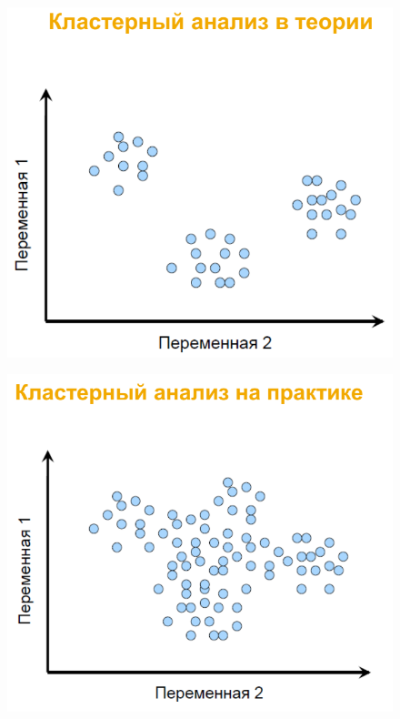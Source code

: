 \documentclass{beamer}
\begin{document}
\begin{frame}
\begin{minipage}{0.4\textwidth}
\begin{flushleft}
\begin{figure}[h]
\includegraphics[scale=0.3]{images/lec07-pic04.png}
\end{figure}
\end{flushleft}
\end{minipage}
\hfill
\begin{minipage}{0.5\textwidth}
\begin{flushright}
\begin{figure}[h]
\includegraphics[scale=0.3]{images/lec07-pic05.png}
\end{figure}
\end{flushright}
\end{minipage}
\end{frame}
\end{document}
